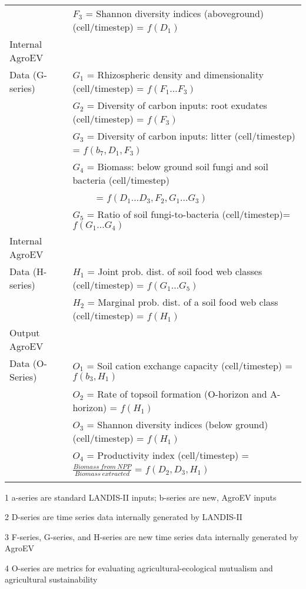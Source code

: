 \documentclass[12pt, letterpaper]{article}
\begin{document}
\begin{table}
\begin{threeparttable}[b]
\begin{tabular}{ll}
    & $F_3$ = Shannon diversity indices (aboveground) (cell/timestep) = $ f(D_1)$ \\
    Internal AgroEV & \\
    Data (G-series) \tnote{3} & $G_1$ = Rhizospheric density and dimensionality (cell/timestep) = $f(F_1 \dots F_3)$  \\
    & $G_2$ = Diversity of carbon inputs: root exudates (cell/timestep) = $f(F_3)$ \\
    & $G_3$ = Diversity of carbon inputs: litter (cell/timestep) = $f(b_7, D_1, F_3)$ \\
    & $G_4$ = Biomass: below ground soil fungi and soil bacteria (cell/timestep) \\
    & \ \ \ \ \ = $ f(D_1 \dots D_3, F_2, G_1 \dots G_3) $ \\
    & $G_5$ = Ratio of soil fungi-to-bacteria  (cell/timestep)= $ f(G_1 \dots G_4)$ \\
    Internal AgroEV & \\
    Data (H-series) \tnote{3} & $H_1$ = Joint prob. dist. of soil food web classes (cell/timestep) = $ f(G_1 \dots G_5)$ \\
    & $H_2$ = Marginal prob. dist. of a soil food web class (cell/timestep) = $ f(H_1)$ \\
    Output AgroEV & \\
    Data (O-Series) \tnote{4} & $O_1$ = Soil cation exchange capacity (cell/timestep) = $f(b_3, H_1)$ \\
    & $O_2$ = Rate of topsoil formation (O-horizon and A-horizon)  = $f(H_1)$ \\
    & $O_3$ = Shannon diversity indices (below ground) (cell/timestep) = $ f(H_1)$ \\
    & $O_4$ = Productivity index (cell/timestep) = $ \frac{Biomass \ from \ NPP}{Biomass \ extracted}$ = $ f(D_2, D_3, H_1)$ \\
	\hline \\[-1.8ex]
    \end{tabular}
    \begin{tablenotes}
    \footnotesize 
    \item [1] a-series are standard LANDIS-II inputs; b-series are new, AgroEV inputs 
    \item [2] D-series are time series data internally generated by LANDIS-II 
    \item [3] F-series, G-series, and H-series are new time series data internally generated by AgroEV
    \item [4] O-series are metrics for evaluating agricultural-ecological mutualism and agricultural sustainability 
    \end{tablenotes} 
  \end{threeparttable}
\end{table}
\end{document}
